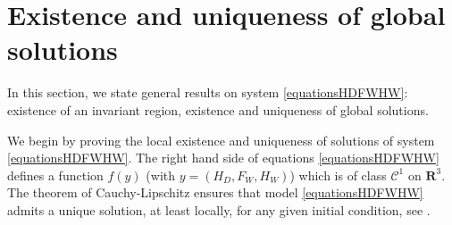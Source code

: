 \documentclass{article}
\newcommand{\lfw}{\lambda_{F}}
\newcommand{\lfw}{\lambda_{F}}
\begin{document}

\section{Existence and uniqueness of global solutions}
In this section, we state general results on system \eqref{equationsHDFWHW}:  existence of an invariant region, existence and uniqueness of global solutions.

We begin by proving the local existence and uniqueness of solutions of system \eqref{equationsHDFWHW}. The right hand side of equations \eqref{equationsHDFWHW} defines a function $f(y)$ (with $y = (H_D, F_W, H_W)$) which is of class $\mathcal{C}^1$ on $\mathbf{R}^3$. The theorem of Cauchy-Lipschitz ensures that model \eqref{equationsHDFWHW} admits a unique solution, at least locally, for any given initial condition, see \cite{walter_ordinary_1998}.
\end{document}
